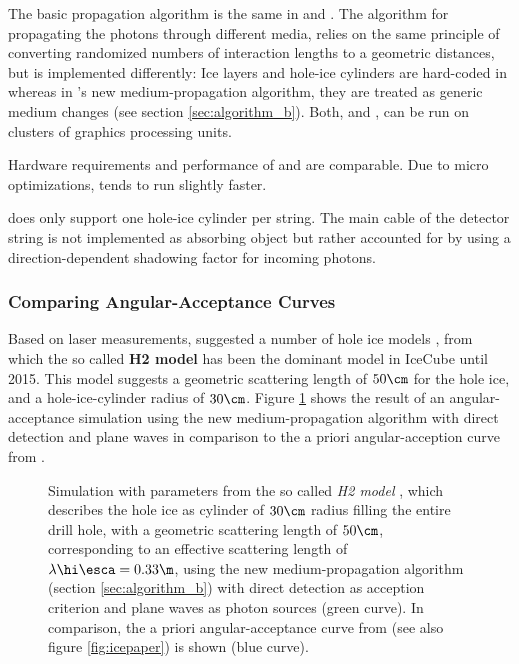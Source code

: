 The basic propagation algorithm is the same in \ppc and \clsim. The algorithm for propagating the photons through different media, relies on the same principle of converting randomized numbers of interaction lengths to a geometric distances, but is implemented differently: Ice layers and hole-ice cylinders are hard-coded in \ppc whereas in \clsim's new medium-propagation algorithm, they are treated as generic medium changes (see section \ref{sec:algorithm_b}). Both, \ppc and \clsim, can be run on clusters of graphics processing units.

Hardware requirements and performance of \ppc and \clsim are comparable. Due to micro optimizations, \ppc tends to run slightly faster. \mref{}

\ppc does only support one hole-ice cylinder per string. The main cable of the detector string is not implemented as absorbing object but rather accounted for by using a direction-dependent shadowing factor for incoming photons. \cite{ppcsource}\cite{ppcforhumans}


\subsubsection{Comparing Angular-Acceptance Curves}
\label{sec:angular_acceptance_comparison}


Based on laser measurements,  suggested a number of hole ice models \cite{holeicestudieswithyag}, from which the so called \textbf{H2 model} has been the dominant model in IceCube until 2015. This model suggests a geometric scattering length of $50\cm$ for the hole ice, and a hole-ice-cylinder radius of $30\cm$. Figure \ref{fig:xaeg2Mee} shows the result of an angular-acceptance simulation using the new medium-propagation algorithm with direct detection and plane waves in comparison to the a priori angular-acception curve from \cite{icepaper}.

\begin{figure}[htbp]
  \caption{Simulation with parameters from the so called \textit{H2 model} \cite{holeicestudieswithyag}, which describes the hole ice as cylinder of $30\cm$ radius filling the entire drill hole, with a geometric scattering length of $50\cm$, corresponding to an effective scattering length of $\lambda\hi\esca = 0.33\m$, using the new medium-propagation algorithm (section \ref{sec:algorithm_b}) with direct detection as acception criterion and plane waves as photon sources (green curve). In comparison, the a priori angular-acceptance curve from \cite{icepaper} (see also figure \ref{fig:icepaper}) is shown (blue curve).}
  \label{fig:xaeg2Mee}
\end{figure}

